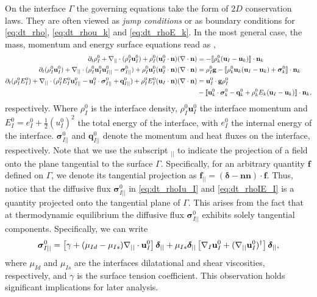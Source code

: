 On the interface $\Gamma$ the governing equations take the form of $2D$ conservation laws. 
They are often viewed as \textit{jump conditions} or as boundary conditions for  \ref{eq:dt_rho}, \ref{eq:dt_rhou_k} and \ref{eq:dt_rhoE_k}. 
In the most general case, the mass, momentum and energy surface equations read as \citep{ishii2010thermo,morel2015mathematical,bothe2022sharp}, 
\begin{align}
    \label{eq:dt_rhoI}
    \partial_t \rho_I^0
    + \mathbf{\nabla}_{||}\cdot (\rho_I^0\textbf{u}_{I}^0)
    + \rho_I^0 (\textbf{u}_I^0 \cdot \textbf{n})(\mathbf{\nabla}\cdot \textbf{n})
    &= 
    -\llbracket 
        \rho_k^0 (\textbf{u}_I - \textbf{u}_k)
     \rrbracket \cdot \textbf{n}_k
    \\
    \label{eq:dt_rhoIu_I}
    \partial_t (\rho_I^0\textbf{u}_I^0)  
    + \mathbf{\nabla}_{||}\cdot (
        \rho_I^0\textbf{u}_{I}^0\textbf{u}_{I||}^0
        - \bm{\sigma}_{I||}^0)
        + \rho_I^0 \textbf{u}_I^0 (\textbf{u}_I^0 \cdot \textbf{n})(\mathbf{\nabla}\cdot \textbf{n})
    &= 
    \rho_I^0 \textbf{g}
    - \llbracket 
        \rho_k^0 \textbf{u}_k (\textbf{u}_I - \textbf{u}_k)
        + \bm\sigma^0_k
     \rrbracket \cdot \textbf{n}_k
    \\
    \label{eq:dt_rhoIE_I}
    \partial_t (\rho_I^0E_I^0)  
    + \mathbf{\nabla}_{||}\cdot (
        \rho_I^0 E_I^0\textbf{u}_{I||}^0
        - \textbf{u}_I^0 \cdot \bm{\sigma}_{I||}^0 
        + \textbf{q}_{I||}^0
        )
    + \rho_I^0E_I^0  (\textbf{u}_I \cdot \textbf{n})(\mathbf{\nabla}\cdot \textbf{n})
    &= 
    \textbf{u}_I^0 \cdot \textbf{g}  \rho_I^0 \nonumber\\
    &- \llbracket \textbf{u}_k^0 \cdot \bm{\sigma}_k^0 - \textbf{q}_k^0
    + \rho_k^0 E_k (\textbf{u}_I - \textbf{u}_k)
     \rrbracket \cdot \textbf{n}_k,
\end{align} 
respectively.
Where $\rho_I^0$ is the interface density, $\rho_I^0\textbf{u}_I^0$ the interface momentum 
and $E_I^0 = e_I^0 + \frac{1}{2}(u_I^0)^2$ the total energy of the interface, with $e_I^0$ the internal energy of the interface.
$\bm{\sigma}_{I||}^0$ and $\textbf{q}_{I||}^0$ denote the momentum and heat fluxes on the interface, respectively.
Note that we use the subscript  $_{||}$ to indicate the projection of a field onto the plane tangential to the surface $\Gamma$. 
Specifically, for an arbitrary quantity $\textbf{f}$ defined on $\Gamma$, we denote its tangential projection as $\textbf{f}_{||} = (\bm\delta-\textbf{nn})\cdot \textbf{f}$. 
Thus, notice that the diffusive flux $\bm{\sigma}_{I||}^0$ in \ref{eq:dt_rhoIu_I} and \ref{eq:dt_rhoIE_I} is a quantity projected onto the tangential plane of $\Gamma$.
This arises from the fact that at thermodynamic equilibrium the diffusive flux $\bm{\sigma}_{I||}^0$ exhibits solely tangential components.
Specifically, we can write \citep{nadim1996concise,bothe2022sharp}
\begin{equation}
    \bm\sigma_{I||}^0 = \left[\gamma + (\mu_{Id} -\mu_{Is}) \mathbf{\nabla}_{||}\cdot\textbf{u}_I^0\right] \bm\delta_{||}
    +  \mu_{Is} \bm\delta_{||} \left[\mathbf{\nabla}_I\textbf{u}_I^0 + (\mathbf{\nabla}_{||} \textbf{u}_I^0)^\dagger\right] \bm\delta_{||},
    \label{eq:surface_fluxes}
\end{equation}
where $\mu_{Id}$ and $\mu_{Is}$ are the interfaces dilatational and shear viscosities, respectively, and $\gamma$ is the surface tension coefficient. 
This observation holds significant implications for later analysis.

